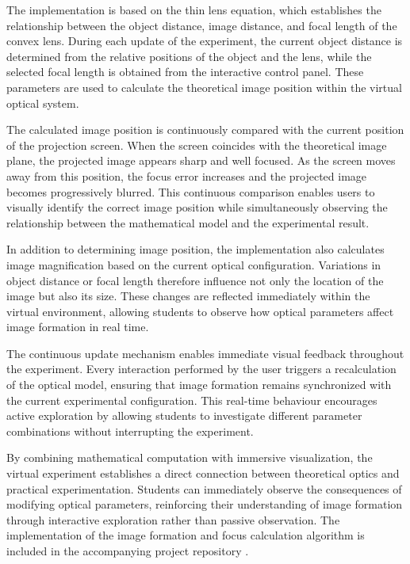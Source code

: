 The implementation is based on the thin lens equation, which establishes the relationship between the object distance, image distance, and focal length of the convex lens. During each update of the experiment, the current object distance is determined from the relative positions of the object and the lens, while the selected focal length is obtained from the interactive control panel. These parameters are used to calculate the theoretical image position within the virtual optical system.

The calculated image position is continuously compared with the current position of the projection screen. When the screen coincides with the theoretical image plane, the projected image appears sharp and well focused. As the screen moves away from this position, the focus error increases and the projected image becomes progressively blurred. This continuous comparison enables users to visually identify the correct image position while simultaneously observing the relationship between the mathematical model and the experimental result.

In addition to determining image position, the implementation also calculates image magnification based on the current optical configuration. Variations in object distance or focal length therefore influence not only the location of the image but also its size. These changes are reflected immediately within the virtual environment, allowing students to observe how optical parameters affect image formation in real time.

The continuous update mechanism enables immediate visual feedback throughout the experiment. Every interaction performed by the user triggers a recalculation of the optical model, ensuring that image formation remains synchronized with the current experimental configuration. This real-time behaviour encourages active exploration by allowing students to investigate different parameter combinations without interrupting the experiment.

By combining mathematical computation with immersive visualization, the virtual experiment establishes a direct connection between theoretical optics and practical experimentation. Students can immediately observe the consequences of modifying optical parameters, reinforcing their understanding of image formation through interactive exploration rather than passive observation. The implementation of the image formation and focus calculation algorithm is included in the accompanying project repository \cite{thesisRepo}.

